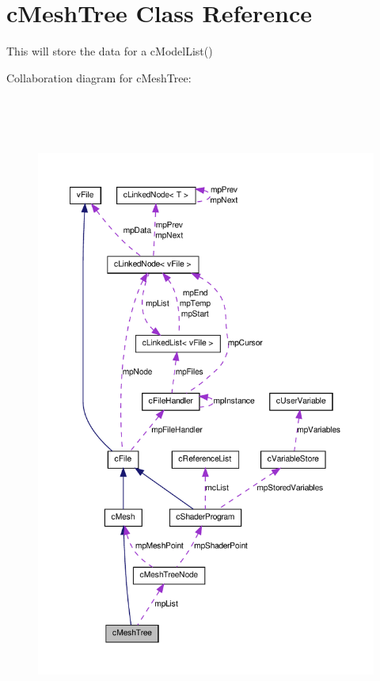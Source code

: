 \hypertarget{classc_mesh_tree}{
\section{cMeshTree Class Reference}
\label{classc_mesh_tree}
}


This will store the data for a cModelList()  




Collaboration diagram for cMeshTree:\nopagebreak
\begin{figure}[H]
\begin{center}
\leavevmode
\includegraphics[height=600pt]{classc_mesh_tree__coll__graph}
\end{center}
\end{figure}

